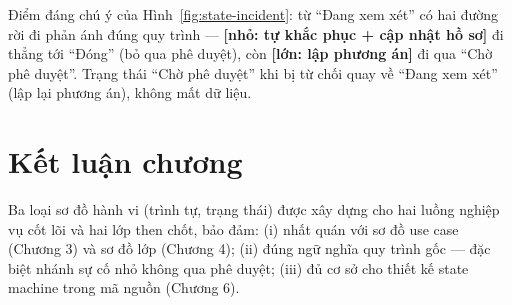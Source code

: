 Điểm đáng chú ý của Hình~\ref{fig:state-incident}: từ ``Đang xem xét'' có hai đường rời đi phản ánh đúng quy trình — \textbf{[nhỏ: tự khắc phục + cập nhật hồ sơ]} đi thẳng tới ``Đóng'' (bỏ qua phê duyệt), còn \textbf{[lớn: lập phương án]} đi qua ``Chờ phê duyệt''. Trạng thái ``Chờ phê duyệt'' khi bị từ chối quay về ``Đang xem xét'' (lập lại phương án), không mất dữ liệu.

\section{Kết luận chương}

Ba loại sơ đồ hành vi (trình tự, trạng thái) được xây dựng cho hai luồng nghiệp vụ cốt lõi và hai lớp then chốt, bảo đảm: (i) nhất quán với sơ đồ use case (Chương 3) và sơ đồ lớp (Chương 4); (ii) đúng ngữ nghĩa quy trình gốc — đặc biệt nhánh sự cố nhỏ không qua phê duyệt; (iii) đủ cơ sở cho thiết kế state machine trong mã nguồn (Chương 6).
